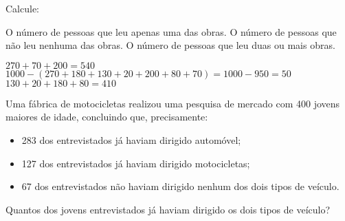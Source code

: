 \documentclass[a4paper,11pt,addpoints]{exam}
\begin{document}
\begin{questions}
Calcule:

\begin{tasks}
  \task O número de pessoas que leu apenas uma das obras.
  \task O número de pessoas que não leu nenhuma das obras.
  \task O número de pessoas que leu duas ou mais obras.
\end{tasks}

\begin{solution}[1in]
  \begin{center}
  \end{center}
  
  \begin{tasks}
    \task $270 + 70 + 200 = \boxed{540}$
    \task $1000 - (270+180+130+20+200+80+70) = 1000 - 950 = \boxed{50}$
    \task $130 + 20 + 180 + 80 = \boxed{410}$
  \end{tasks}
  
\end{solution}

\question[1]
Uma fábrica de motocicletas realizou uma pesquisa de mercado com 400 jovens maiores de idade, concluindo
que, precisamente:
\begin{itemize}
  \item 283 dos entrevistados já haviam dirigido automóvel;
  \item 127 dos entrevistados já haviam dirigido motocicletas;
  \item 67 dos entrevistados não haviam dirigido nenhum dos dois tipos de veículo. 
\end{itemize}

Quantos dos jovens entrevistados já haviam dirigido os dois tipos de veículo?

\begin{solution}[1in]
  \begin{center}
    \begin{tikzpicture}


\end{tikzpicture}
\end{center}
\end{solution}
\end{questions}
\end{document}
